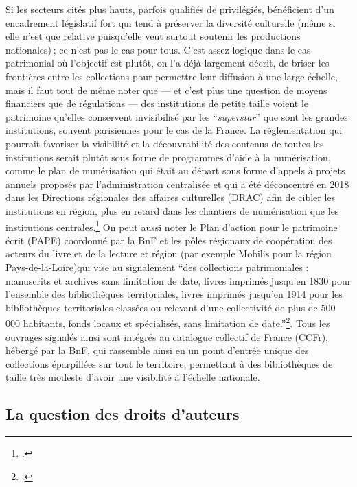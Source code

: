 Si les secteurs cités plus hauts, parfois qualifiés de privilégiés, bénéficient d’un encadrement législatif fort qui tend à préserver la diversité culturelle (même si elle n’est que relative puisqu’elle veut surtout soutenir les productions nationales) ; ce n’est pas le cas pour tous. C’est assez logique dans le cas patrimonial où l’objectif est plutôt, on l’a déjà largement décrit, de briser les frontières entre les collections pour permettre leur diffusion à une large échelle, mais il faut tout de même noter que — et c’est plus une question de moyens financiers que de régulations — des institutions de petite taille voient le patrimoine qu’elles conservent invisibilisé par les \enquote{\textit{superstar}} que sont les grandes institutions, souvent parisiennes pour le cas de la France. La réglementation qui pourrait favoriser la visibilité et la découvrabilité des contenus de toutes les institutions serait plutôt sous forme de programmes d'aide à la numérisation, comme le plan de numérisation qui était au départ sous forme d'appels à projets annuels proposés par l'administration centralisée et qui a été déconcentré en 2018 dans les Directions régionales des affaires culturelles (DRAC) afin de cibler les institutions en région, plus en retard dans les chantiers de numérisation que les institutions centrales.\footcite{zotero-686} On peut aussi noter le Plan d'action pour le patrimoine écrit (PAPE) coordonné par la BnF et les pôles régionaux de coopération des acteurs du livre et de la lecture et région (par exemple Mobilis pour la région Pays-de-la-Loire)qui vise au signalement \enquote{des collections patrimoniales : manuscrits et archives sans limitation de date, livres imprimés jusqu’en 1830 pour l’ensemble des bibliothèques territoriales, livres imprimés jusqu’en 1914 pour les bibliothèques territoriales classées ou relevant d’une collectivité de plus de 500 000 habitants, fonds locaux et spécialisés, sans limitation de date.}\footcite{zotero-688}. Tous les ouvrages signalés ainsi sont intégrés au catalogue collectif de France (CCFr), hébergé par la BnF, qui rassemble ainsi en un point d'entrée unique des collections éparpillées sur tout le territoire, permettant à des bibliothèques de taille très modeste d'avoir une visibilité à l'échelle nationale. 

\subsection{La question des droits d'auteurs}


